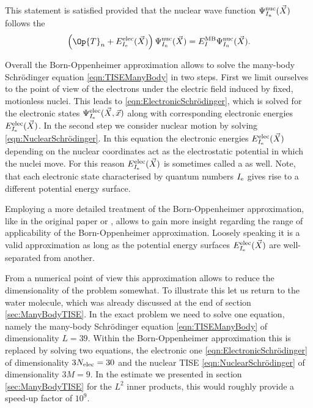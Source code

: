This statement is satisfied provided that the nuclear wave function
$\Psi^\text{nuc}_{I_\text{n}}(\vec{X})$
follows the 
\begin{equation}
	\left( \Op{T}_n + E^\text{elec}_{\Iel}(\vec{X}) \right)
	\Psi^\text{nuc}_{\Inu}(\vec{X})
	= E^\text{MB}_I \Psi^\text{nuc}_{\Inu}(\vec{X}).
	\label{eqn:NuclearSchrödinger}
\end{equation}

Overall the Born-Oppenheimer approximation
allows to solve the many-body Schrödinger equation \eqref{eqn:TISEManyBody} in two steps.
First we limit ourselves to the point of view of the electrons
under the electric field induced by fixed, motionless nuclei.
This leads to \eqref{eqn:ElectronicSchrödinger},
which is solved for the
electronic states $\Psi^\text{elec}_{I_\text{e}}(\vec{X}, \vec{x})$
along with corresponding electronic energies $E^\text{elec}_{I_\text{e}}(\vec{X})$.
In the second step we consider nuclear motion by solving
\eqref{eqn:NuclearSchrödinger}.
In this equation the electronic energies $E^\text{elec}_{I_\text{e}}(\vec{X})$
depending on the nuclear coordinates act as the electrostatic potential
in which the nuclei move.
For this reason $E^\text{elec}_{I_\text{e}}(\vec{X})$ is sometimes
called a  as well.
Note, that each electronic state characterised by quantum numbers $I_\text{e}$
gives rise to a different potential energy surface.

Employing a more detailed treatment of the Born-Oppenheimer approximation,
like in the original paper \cite{Born1927} or \citet{Baer2006},
allows to gain more insight regarding the range of applicability
of the Born-Oppenheimer approximation.
Loosely speaking it is a valid approximation
as long as the potential energy surfaces $E^\text{elec}_{I_\text{e}}(\vec{X})$
are well-separated from another.

From a numerical point of view this approximation allows to reduce
the dimensionality of the problem somewhat.
To illustrate this let us return to the water molecule,
which was already discussed at the end of section \vref{sec:ManyBodyTISE}.
In the exact problem we need to solve one equation,
namely the many-body Schrödinger equation \eqref{eqn:TISEManyBody}
of dimensionality $L = 39$.
Within the Born-Oppenheimer approximation
this is replaced by solving two equations,
the electronic one \eqref{eqn:ElectronicSchrödinger} of dimensionality $3 N_\text{elec} = 30$
and the nuclear TISE \eqref{eqn:NuclearSchrödinger} of dimensionality $3 M = 9$.
In the estimate we presented in section \vref{sec:ManyBodyTISE}
for the $L^2$ inner products,
this would roughly provide a speed-up factor of $10^9$.

